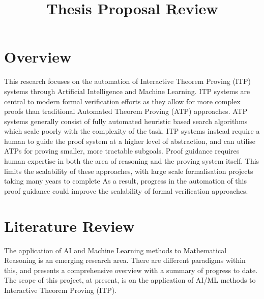 \documentclass{article}
\title{Thesis Proposal Review}
\begin{document}
    \maketitle

    \section{Overview}\label{sec:overview}
    This research focuses on the automation of Interactive Theorem Proving (ITP) systems through Artificial Intelligence and Machine Learning.
    ITP systems are central to modern formal verification efforts as they allow for more complex proofs than traditional Automated Theorem Proving (ATP) approaches\cite{nawaz_survey_2019, harrison_history_2014}.
    ATP systems generally consist of fully automated heuristic based search algorithms which scale poorly with the complexity of the task.
    ITP systems instead require a human to guide the proof system at a higher level of abstraction, and can utilise ATPs for proving smaller, more tractable subgoals.
    Proof guidance requires human expertise in both the area of reasoning and the proving system itself.
    This limits the scalability of these approaches, with large scale formalisation projects taking many years to complete\cite{wiedijk_bruijn_2000}
    As a result, progress in the automation of this proof guidance could improve the scalability of formal verification approaches.  \\





    \section{Literature Review}\label{sec:literature-review}
    The application of AI and Machine Learning methods to Mathematical Reasoning is an emerging research area.
    There are different paradigms within this, and\cite{lu_survey_nodate} presents a comprehensive overview with a summary of progress to date.
    The scope of this project, at present, is on the application of AI/ML methods to Interactive Theorem Proving (ITP). \\
\end{document}
